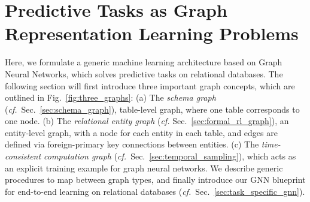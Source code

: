 

\section{Predictive Tasks as Graph Representation Learning Problems}\label{sec:formal_rl_problem}

Here, we formulate a generic machine learning architecture based on Graph Neural Networks, which solves predictive tasks on relational databases.
The following section will first introduce three important graph concepts, which are outlined in Fig.~\ref{fig:three_graphs}: (a) The \emph{schema graph} (\emph{cf.}~Sec.~\ref{sec:schema_graph}), table-level graph, where one table corresponds to one node. (b) The \emph{relational entity graph} (\emph{cf.} Sec.~\ref{sec:formal_rl_graph}), an entity-level graph, with a node for each entity in each table, and edges are defined via foreign-primary key connections between entities. (c) The \emph{time-consistent computation graph} (\emph{cf.}~Sec.~\ref{sec:temporal_sampling}), which acts as an explicit training example for graph neural networks.
We describe generic procedures to map between graph types, and finally introduce our GNN blueprint for end-to-end learning on relational databases (\emph{cf.}~Sec.~\ref{sec:task_specific_gnn}).

